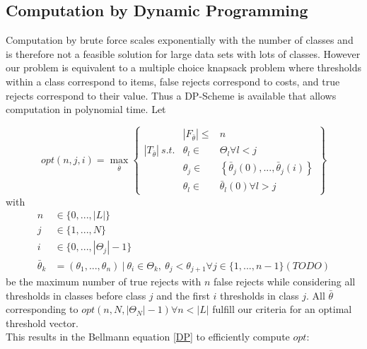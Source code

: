 \subsection{Computation by Dynamic Programming}
\label{dp}
Computation by brute force scales exponentially with the number of classes and is therefore not a feasible solution for large data sets with lots of classes. However our problem is equivalent to a multiple choice knapsack problem \cite{Sin:1979} where thresholds within a class correspond to items, false rejects correspond to costs, and true rejects correspond to their value. Thus a DP-Scheme is available that allows computation in polynomial time.
Let

$$
opt(n,j,i) = \max_{\bar{\theta}}
\begin{Bmatrix}
	 & \left|F_{\bar{\theta}}\right| \leq  & n \\
  	\left|T_{\bar{\theta}}\right| \ s.t. & \theta_l \in & \Theta_l \forall l < j \\
  	 & \theta_j \in & \left\{\bar{\theta}_j(0),...,\bar{\theta}_j(i)\right\} \\
  	 & \theta_l \in & \bar{\theta}_l(0) \forall l > j
\end{Bmatrix}
$$
with 
\begin{align}
	n &\in \{0,...,|L|\} \\
	j &\in \{1,...,N\} \\
	i &\in \{0,...,\left|\Theta_j\right|-1\} \\
	\bar{\theta}_k &= (\theta_1,...,\theta_n) \ | \ \theta_i \in \Theta_k, \ \theta_j < \theta_{j+1} \forall j \in \{1,...,n-1\} (TODO)
\end{align}
be the maximum number of true rejects with $n$ false rejects while considering all thresholds in classes before class $j$ and the first $i$ thresholds in class $j$. All $\bar{\theta}$ corresponding to $opt(n,N,\left|\Theta_N\right|-1) \forall n<\left|L\right|$ fulfill our criteria for an optimal threshold vector. \\
This results in the Bellmann equation \ref{DP} \cite{Bel:1957} to efficiently compute $opt$:

